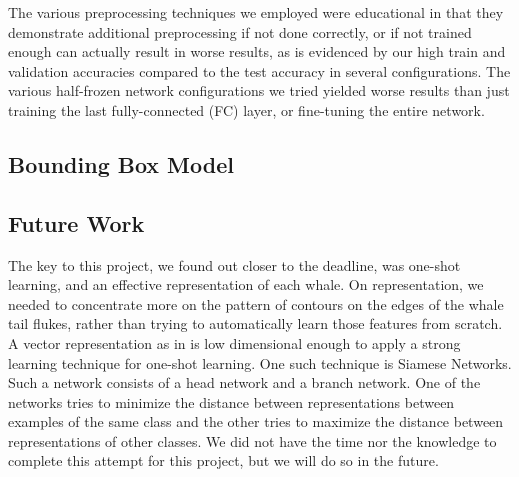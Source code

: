 The various preprocessing techniques we employed were educational in that they demonstrate additional preprocessing if not done correctly, or if not trained enough can actually result in worse results, as is evidenced by our high train and validation accuracies compared to the test accuracy in several configurations. The various half-frozen network configurations we tried yielded worse results than just training the last fully-connected (FC) layer, or fine-tuning the entire network.

\subsection{Bounding Box Model}

\subsection{Future Work}

The key to this project, we found out closer to the deadline, was one-shot learning, and an effective representation of each whale. On representation, we needed to concentrate more on the pattern of contours on the edges of the whale tail flukes, rather than trying to automatically learn those features from scratch. A vector representation as in \cite{weideman2017integral} is low dimensional enough to apply a strong learning technique for one-shot learning. One such technique is Siamese Networks. Such a network consists of a head network and a branch network. One of the networks tries to minimize the distance between representations between examples of the same class and the other tries to maximize the distance between representations of other classes. We did not have the time nor the knowledge to complete this attempt for this project, but we will do so in the future.
